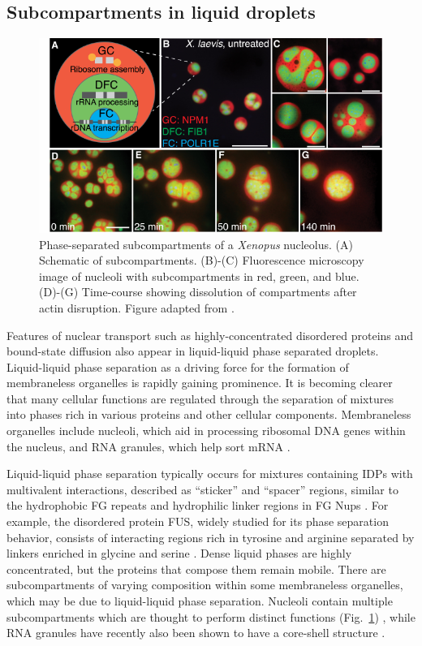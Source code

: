 \subsection{Subcompartments in liquid droplets}

\begin{figure}
\centering
\includegraphics[width=0.7\linewidth]{figs/ch01/feric16.pdf}
\caption[Phase-separated subcompartments of the nucleolus.]{ Phase-separated subcompartments of a \textit{Xenopus} nucleolus. (A) Schematic of subcompartments. (B)-(C) Fluorescence microscopy image of nucleoli with subcompartments in red, green, and blue. (D)-(G) Time-course showing dissolution of compartments after actin disruption. Figure adapted from \cite{feric16}.}
\label{fig:nucleolus}
\end{figure}

Features of nuclear transport such as highly-concentrated disordered proteins and bound-state diffusion also appear in liquid-liquid phase separated droplets.  Liquid-liquid phase separation as a driving force for the formation of membraneless organelles is rapidly gaining prominence.   It is becoming clearer that many cellular functions are regulated through the separation of mixtures into phases rich in various proteins and other cellular components.  Membraneless organelles include nucleoli, which aid in processing ribosomal DNA genes within the nucleus, and RNA granules, which help sort mRNA \cite{shiina19, brangwynne15}.

Liquid-liquid phase separation typically occurs for mixtures containing IDPs with multivalent interactions, described as ``sticker'' and ``spacer'' regions, similar to the hydrophobic FG repeats and hydrophilic linker regions in FG Nups \cite{posey18}.  For example, the disordered protein FUS, widely studied for its phase separation behavior, consists of interacting regions rich in tyrosine and arginine separated by linkers enriched in glycine and serine \cite{wang18}.  Dense liquid phases are highly concentrated, but the proteins that compose them remain mobile.  There are subcompartments of varying composition within some membraneless organelles, which may be due to liquid-liquid phase separation.  Nucleoli contain multiple subcompartments which are thought to perform distinct functions (Fig.~\ref{fig:nucleolus}) \cite{feric16,catalano15,oday19}, while RNA granules have recently also been shown to have a core-shell structure \cite{jain16,shiina19}.

